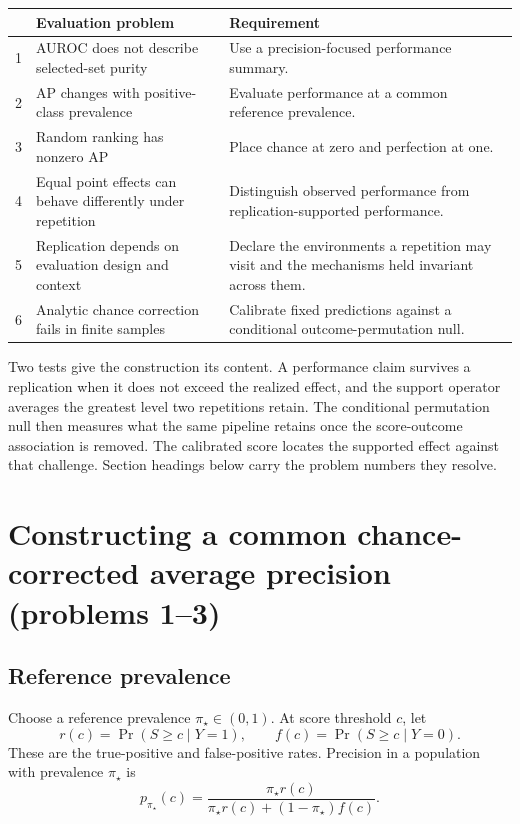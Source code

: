 \documentclass[11pt]{article}
\theoremstyle{remark}
\begin{document}
\begin{tabularx}{\textwidth}{@{}c>{\raggedright\arraybackslash}p{}>{\raggedright\arraybackslash}X@{}}
\toprule
& Evaluation problem & Requirement \\
\midrule
1 & AUROC does not describe selected-set purity & Use a precision-focused performance summary. \\
2 & AP changes with positive-class prevalence & Evaluate performance at a common reference prevalence. \\
3 & Random ranking has nonzero AP & Place chance at zero and perfection at one. \\
4 & Equal point effects can behave differently under repetition & Distinguish observed performance from replication-supported performance. \\
5 & Replication depends on evaluation design and context & Declare the environments a repetition may visit and the mechanisms held invariant across them. \\
6 & Analytic chance correction fails in finite samples & Calibrate fixed predictions against a conditional outcome-permutation null. \\
\bottomrule
\end{tabularx}

Two tests give the construction its content. A performance claim survives a replication when it does not exceed the realized effect, and the support operator averages the greatest level two repetitions retain. The conditional permutation null then measures what the same pipeline retains once the score-outcome association is removed. The calibrated score locates the supported effect against that challenge. Section headings below carry the problem numbers they resolve.

\section{Constructing a common chance-corrected average precision (problems 1--3)}
\label{sec:common-scale}

\subsection{Reference prevalence}

Choose a reference prevalence $\pi_\star\in(0,1)$. At score threshold $c$, let
\[
r(c)=\Pr(S\geq c\mid Y=1),
\qquad
f(c)=\Pr(S\geq c\mid Y=0).
\]
These are the true-positive and false-positive rates. Precision in a population with prevalence $\pi_\star$ is
\begin{equation}
 p_{\pi_\star}(c)
 =
 \frac{\pi_\star r(c)}
 {\pi_\star r(c)+(1-\pi_\star)f(c)}.
 \label{eq:main-reference-precision}
\end{equation}
\end{document}
